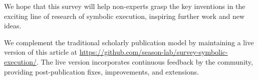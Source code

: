 We hope that this survey will help non-experts grasp the key inventions in the exciting line of research of symbolic execution, inspiring further work and new ideas.
\fi



\ifdefined\arxivver
{}
We complement the traditional scholarly publication model by maintaining a live version of this article at {\href{https://github.com/season-lab/survey-symbolic-execution}{https://github.com/season-lab/survey-symbolic-execution/}}. The live version incorporates continuous feedback by the community, providing post-publication fixes, improvements, and extensions.
\fi
